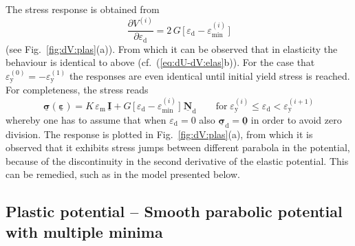 \documentclass[times,namecite]{goose-article}
\newcommand\T[1]{\underline{\bm{{#1}}}}
\begin{document}
The stress response is obtained from
\begin{equation}
    \label{eq:dV-plas}
    \frac{\partial V^{(i)}}{\partial \varepsilon_\mathrm{d}}
    =
    2 \, G \, \Big[\, \varepsilon_\mathrm{d} - \varepsilon_\mathrm{min}^{(i)} \,\Big]
\end{equation}
(see Fig.~\ref{fig:dV:plas}(a)). From which it can be observed that in elasticity the behaviour is identical to above (cf.~(\ref{eq:dU-dV:elas}b)). For the case that $\varepsilon_\mathrm{y}^{(0)} = - \varepsilon_\mathrm{y}^{(1)}$ the responses are even identical until initial yield stress is reached. For completeness, the stress reads
\begin{equation}
    \T{\sigma} ( \T{\varepsilon} )
    =
    K \, \varepsilon_\mathrm{m} \, \T{I}
    +
    G \, \Big[\, \varepsilon_\mathrm{d} - \varepsilon_\mathrm{min}^{(i)} \,\Big] \;
    \T{N}_\mathrm{d}
    \qquad
    \mathrm{for}
    \;
    \varepsilon_\mathrm{y}^{(i)} \leq \varepsilon_\mathrm{d} < \varepsilon_\mathrm{y}^{(i+1)}
\end{equation}
whereby one has to assume that when $\varepsilon_\mathrm{d} = 0$ also $\T{\sigma}_\mathrm{d} = \T{0}$ in order to avoid zero division. The response is plotted in Fig.~\ref{fig:dV:plas}(a), from which it is observed that it exhibits stress jumps between different parabola in the potential, because of the discontinuity in the second derivative of the elastic potential. This can be remedied, such as in the model presented below.

\subsection{Plastic potential -- Smooth parabolic potential with multiple minima}
\end{document}
